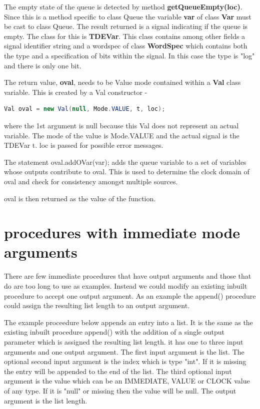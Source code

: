         The empty state of the queue is detected by method
        {\bf getQueueEmpty(loc)}. Since this is a method specific to class
        Queue the variable {\bf var} of class {\bf Var} must be cast to class Queue.
        The result returned is a signal indicating if the queue is empty.
        The class for this is {\bf TDEVar}. This class contains among other
        fields a signal identifier string and a wordspec of class {\bf WordSpec}
        which contains both the type and a specification of bits within
        the signal. In this case the type is "log" and there is only one bit.
        
        The return value, {\bf oval}, needs to be Value mode
        contained within a {\bf Val} class variable. This is created
        by a Val constructor -
        
        \begin{lstlisting}[gobble=8, language=java]
             Val oval = new Val(null, Mode.VALUE, t, loc);
        \end{lstlisting}
        
        where the 1st argument is null because this Val does not represent
        an actual variable. The mode of the value is Mode.VALUE and the
        actual signal is the TDEVar t. loc is passed for possible error
        messages.
        
        The statement oval.addOVar(var); adds the queue variable to a set
        of variables whose outputs contribute to oval. This is used to
        determine the clock domain of oval and check for consistency
        amongst multiple sources.
        
        oval is then returned as the value of the function.
       
        
        
        
    \section{procedures with immediate mode arguments}
    
        There are few immediate procedures that have output arguments and those that do
        are too long to use as examples. Instead we could modify an existing inbuilt procedure
        to accept one output argument. As an example the append() procedure could assign
        the resulting list length to an output argument.

        The example proceedure below appends an entry into a list. It is the same as the existing
        inbuilt procedure append() with the addition of a single output parameter which
        is assigned the resulting list length.
        it has one to three input arguments and one output argument.
        The first input argument is the list. The optional second input
        argument is the index which is type "int". If it is missing the
        entry will be appended to the end of the list. The third optional
        input argument is the value which can be an IMMEDIATE, VALUE or
        CLOCK value of any type. If it is "null" or missing then the
        value will be null. The output argument is the list length.
    
